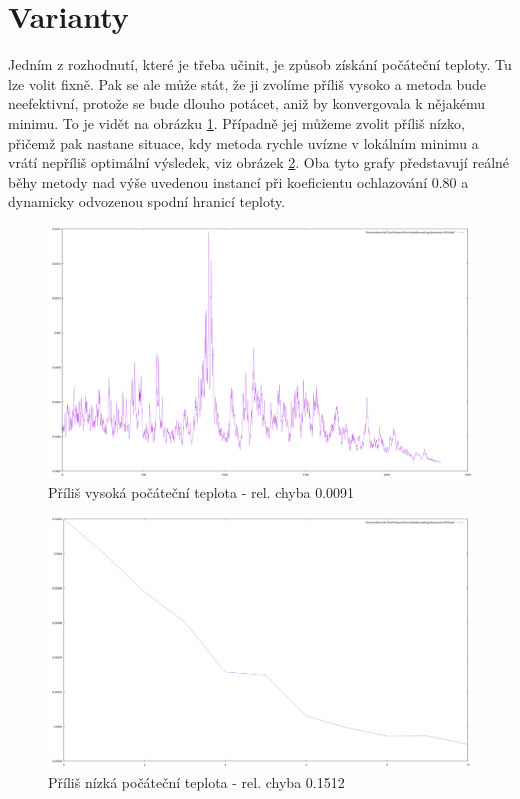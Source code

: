 \documentclass[12pt,a4paper]{article}
\begin{document}
\section{Varianty}

Jedním z rozhodnutí, které je třeba učinit, je způsob získání počáteční teploty. Tu lze volit fixně. Pak se ale může stát, že ji zvolíme příliš vysoko a metoda bude neefektivní, protože se bude dlouho potácet, aniž by konvergovala k nějakému minimu. To je vidět na obrázku \ref{tooHighStart}. Případně jej můžeme zvolit příliš nízko, přičemž pak nastane situace, kdy metoda rychle uvízne v lokálním minimu a vrátí nepříliš optimální výsledek, viz obrázek \ref{tooLowStart}. Oba tyto grafy představují reálné běhy metody nad výše uvedenou instancí při koeficientu ochlazování 0.80 a dynamicky odvozenou spodní hranicí teploty.

\begin{figure}[H]
\includegraphics[width=\textwidth]{tooHighStart}
\caption{Příliš vysoká počáteční teplota - rel. chyba 0.0091}
\label{tooHighStart}
\end{figure}

\begin{figure}[H]
\includegraphics[width=\textwidth]{tooLowStart}
\caption{Příliš nízká počáteční teplota - rel. chyba 0.1512}
\label{tooLowStart}
\end{figure}
\end{document}
